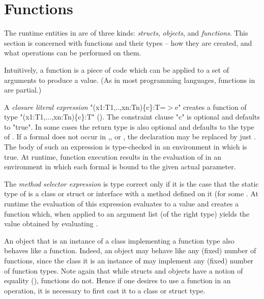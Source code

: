 \section{Functions}
\label{Functions}
\label{functions}

The runtime entities in \Xten{} are of three kinds: \emph{structs},
\emph{objects}, and \emph{functions}. This section is concerned with
functions and their types -- how they are created, and what operations
can be performed on them.

Intuitively, a function is a piece of code which can be applied to a
set of arguments to produce a value. (As in most programming
languages, functions in \Xten{} are partial.)

A \emph{closure literal expression} 
\xcd"(x1:T1,..,xn:Tn)\{c\}:T=$>$e"
creates a function of type \xcd"(x1:T1,...,xn:Tn)\{c\}:T" (). The constraint
clause \xcd"{c}" is optional and defaults to \xcd"{true}". In some cases the
return type  is also optional and defaults to the type of . If a
formal  does not occur in ,, or , the declaration  may be
replaced by just . The body  of such an expression is type-checked
in an environment in which  is true. At runtime, function execution
results in the evaluation of  in an environment in which each formal
is bound to the given actual parameter.

The \emph{method selector expression}  is type
correct only if it is the case that the static type of  is a
class or struct or interface with a method
 defined on it (for some
. At runtime the evaluation of this expression
evaluates  to a value  and creates a function 
which, when applied to an argument list  (of the right
type) yields the value obtained by evaluating .


An object  that is an instance of a class implementing a function
type  also behaves like a function. Indeed, an
object may behave like any (fixed) number of functions, since the
class it is an instance of may implement any (fixed) number of
function types. Note again that while structs and objects have a
notion of equality (\Xcd{==}), functions do not. Hence if one desires to use
a function  in an \Xcd{==} operation, it is necessary to first cast it to a
class or struct type.


  
%


